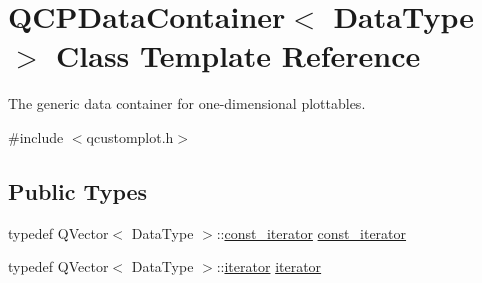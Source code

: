 \hypertarget{class_q_c_p_data_container}{}\section{Q\+C\+P\+Data\+Container$<$ Data\+Type $>$ Class Template Reference}
\label{class_q_c_p_data_container}


The generic data container for one-\/dimensional plottables.  




{\ttfamily \#include $<$qcustomplot.\+h$>$}

\subsection*{Public Types}
\begin{DoxyCompactItemize}
\item 
typedef Q\+Vector$<$ Data\+Type $>$\+::\mbox{\hyperlink{class_q_c_p_data_container_ae40a91f5cb0bcac61d727427449b7d15}{const\+\_\+iterator}} \mbox{\hyperlink{class_q_c_p_data_container_ae40a91f5cb0bcac61d727427449b7d15}{const\+\_\+iterator}}
\item 
typedef Q\+Vector$<$ Data\+Type $>$\+::\mbox{\hyperlink{class_q_c_p_data_container_a1bb453c3ae37d1ee5268878acb3a9d29}{iterator}} \mbox{\hyperlink{class_q_c_p_data_container_a1bb453c3ae37d1ee5268878acb3a9d29}{iterator}}
\end{DoxyCompactItemize}
